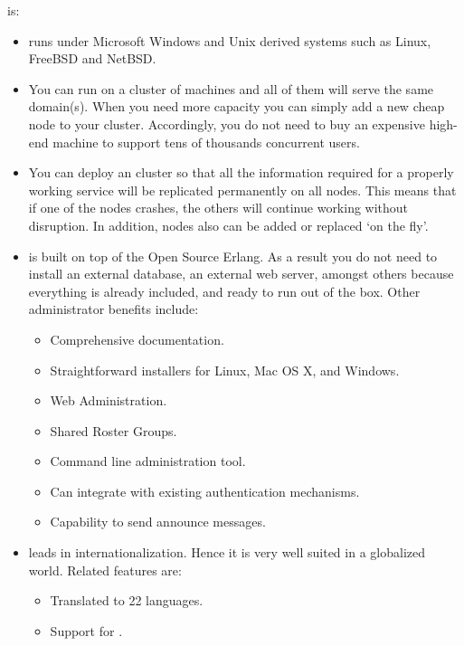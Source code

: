 \ejabberd{} is:
\begin{itemize}
\item {} \ejabberd{} runs under Microsoft Windows and Unix derived systems such as Linux, FreeBSD and NetBSD.

\item {} You can run \ejabberd{} on a cluster of machines and all of them will serve the same \Jabber{} domain(s). When you need more capacity you can simply add a new cheap node to your cluster. Accordingly, you do not need to buy an expensive high-end machine to support tens of thousands concurrent users.

\item {} You can deploy an \ejabberd{} cluster so that all the information required for a properly working service will be replicated permanently on all nodes. This means that if one of the nodes crashes, the others will continue working without disruption. In addition, nodes also can be added or replaced `on the fly'.

\item {} \ejabberd{} is built on top of the Open Source Erlang. As a result you do not need to install an external database, an external web server, amongst others because everything is already included, and ready to run out of the box. Other administrator benefits include:
\begin{itemize}
\item Comprehensive documentation.
\item Straightforward installers for Linux, Mac OS X, and Windows. %
\item Web Administration.
\item Shared Roster Groups.
\item Command line administration tool. %
\item Can integrate with existing authentication mechanisms.
\item Capability to send announce messages.
\end{itemize}

\item {} \ejabberd{} leads in internationalization. Hence it is very well suited in a globalized world. Related features are:
\begin{itemize}
\item Translated to 22 languages. %
\item Support for .
\end{itemize}


\end{itemize}
